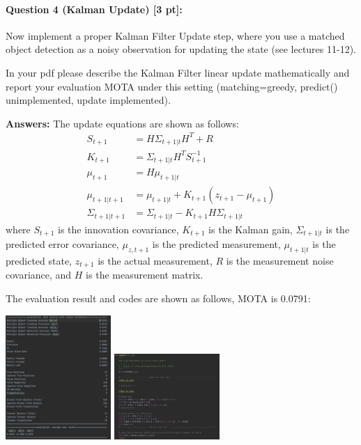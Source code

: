 \documentclass[11pt]{article}
\begin{document}
\paragraph{Question 4 (Kalman Update) [3 pt]:}
Now implement a proper Kalman Filter Update step, where you use a matched object detection as a noisy observation for updating the state (see lectures 11-12). 

In your pdf please describe the Kalman Filter linear update mathematically and report your evaluation MOTA under this setting (matching=greedy, predict() unimplemented, update implemented).

\textbf{Answers:} The update equations are shown as follows:
\begin{align}
    S_{t+1} &= H \Sigma_{t+1|t} H^T + R \label{eq:kf1}\\
    K_{t+1} &= \Sigma_{t+1|t} H^T S_{t+1}^{-1} \label{eq:kf2}\\
    \mu_{t+1} &= H \mu_{t+1|t} \label{eq:kf3}\\
    \mu_{t+1|t+1} &= \mu_{t+1|t} + K_{t+1} (z_{t+1} - \mu_{t+1}) \label{eq:kf4}\\
    \Sigma_{t+1|t+1} &= \Sigma_{t+1|t} - K_{t+1} H \Sigma_{t+1|t} \label{eq:kf5}
\end{align}
where $S_{t+1}$ is the innovation covariance, $K_{t+1}$ is the Kalman gain, $\Sigma_{t+1|t}$ is the predicted error covariance, $\mu_{z,t+1}$ is the predicted measurement, $\mu_{t+1|t}$ is the predicted state, $z_{t+1}$ is the actual measurement, $R$ is the measurement noise covariance, and $H$ is the measurement matrix. 

The evaluation result and codes are shown as follows, MOTA is 0.0791:
\begin{center}
    \includegraphics[width=0.3\textwidth]{./fig/Q4_result.png}
    \includegraphics[width=0.3\textwidth]{./fig/Q4_code.png}
\end{center}
\end{document}
